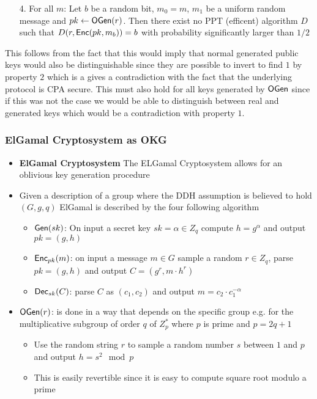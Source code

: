 \begin{itemize}
    \begin{enumerate}
        \item[4.] For all $m$: Let $b$ be a random bit, $m_0 = m$, $m_1$ be a uniform random message and $pk \leftarrow \mathsf{OGen}(r)$. Then there exist no PPT (efficent) algorithm $D$ such that $D(r, \mathsf{Enc}(pk, m_b)) = b$ with probability significantly larger than $1/2$
    \end{enumerate}
    This follows from the fact that this would imply that normal generated public keys would also be distinguishable since they are possible to invert to find $1$ by property $2$ which is a gives a contradiction with the fact that the underlying protocol is CPA secure. This must also hold for all keys generated by $\mathsf{OGen}$ since if this was not the case we would be able to distinguish between real and generated keys which would be a contradiction with property $1$.
\end{itemize}

\subsubsection{ElGamal Cryptosystem as OKG}
\begin{itemize}
    \item \textbf{ElGamal Cryptosystem} The ELGamal Cryptosystem allows for an oblivious key generation procedure
    \item Given a description of a group where the DDH assumption is believed to hold $(G, g, q)$ ElGamal is described by the four following algorithm
    \begin{itemize}
        \item $\mathsf{Gen}(sk)$: On input a secret key $sk = \alpha \in Z_q$ compute $h= g^\alpha$ and output $pk = (g,h)$
        \item $\mathsf{Enc}_{pk}(m)$: on input a message $m \in G$ sample a random $r \in Z_q$, parse $pk = (g, h)$ and output $C = (g^r, m \cdot h^r)$
        \item $\mathsf{Dec}_{sk}(C)$: parse $C$ as $(c_1, c_2)$ and output $m = c_2 \cdot c_1^{-\alpha}$
    \end{itemize}
    \item $\mathsf{OGen}(r)$: is done in a way that depends on the specific group e.g. for the multiplicative subgroup of order $q$ of $Z_p^*$ where $p$ is prime and $p = 2q + 1$
    \begin{itemize}
        \item Use the random string $r$ to sample a random number $s$ between $1$ and $p$ and output $h = s^2 \mod p$
        \item This is easily revertible since it is easy to compute square root modulo a prime
    \end{itemize}

\end{itemize}

